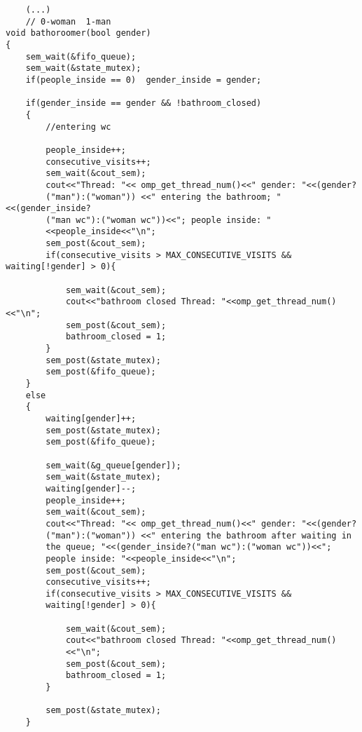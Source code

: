 \documentclass[a4paper,11pt]{article}
\begin{document}
\begin{verbatim}
    (...)
    // 0-woman  1-man
void bathoroomer(bool gender)
{
    sem_wait(&fifo_queue);
    sem_wait(&state_mutex);
    if(people_inside == 0)  gender_inside = gender;
    
    if(gender_inside == gender && !bathroom_closed)
    { 
        //entering wc

        people_inside++;
        consecutive_visits++;
        sem_wait(&cout_sem);
        cout<<"Thread: "<< omp_get_thread_num()<<" gender: "<<(gender?
        ("man"):("woman")) <<" entering the bathroom; "<<(gender_inside?
        ("man wc"):("woman wc"))<<"; people inside: "
        <<people_inside<<"\n";
        sem_post(&cout_sem);    
        if(consecutive_visits > MAX_CONSECUTIVE_VISITS && waiting[!gender] > 0){
            
            sem_wait(&cout_sem); 
            cout<<"bathroom closed Thread: "<<omp_get_thread_num()<<"\n";
            sem_post(&cout_sem);    
            bathroom_closed = 1;
        }
        sem_post(&state_mutex);
        sem_post(&fifo_queue);
    }
    else    
    {
        waiting[gender]++;
        sem_post(&state_mutex);
        sem_post(&fifo_queue);

        sem_wait(&g_queue[gender]);
        sem_wait(&state_mutex);
        waiting[gender]--;
        people_inside++;
        sem_wait(&cout_sem);
        cout<<"Thread: "<< omp_get_thread_num()<<" gender: "<<(gender?
        ("man"):("woman")) <<" entering the bathroom after waiting in 
        the queue; "<<(gender_inside?("man wc"):("woman wc"))<<"; 
        people inside: "<<people_inside<<"\n";
        sem_post(&cout_sem);  
        consecutive_visits++;
        if(consecutive_visits > MAX_CONSECUTIVE_VISITS && 
        waiting[!gender] > 0){
            
            sem_wait(&cout_sem); 
            cout<<"bathroom closed Thread: "<<omp_get_thread_num()
            <<"\n";
            sem_post(&cout_sem);    
            bathroom_closed = 1;
        }

        sem_post(&state_mutex);
    }


\end{verbatim}
\end{document}
